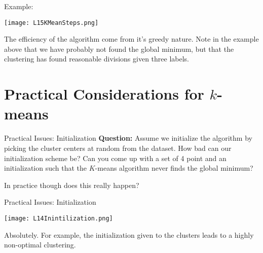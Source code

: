 \documentclass[10pt, table, dvipsnames,xcdraw,handout]{beamer}
\begin{document}
\begin{frame}[fragile]{Example: }
  \begin{minipage}[t][0.6\textheight][t]{\textwidth}
	\centering \texttt{[image: L15KMeanSteps.png]} 
  \end{minipage}
  \vfill
\begin{minipage}[t][0.4\textheight][t]{\textwidth}
The efficiency of the algorithm come from it's greedy nature. Note in the example above that we have probably not found the global minimum, but that the clustering has found reasonable divisions given three labels. 
\end{minipage}
\end{frame}



\section{Practical Considerations for $k$-means}




\begin{frame}[fragile]{Practical Issues: Initialization}
\textbf{Question:} Assume we initialize the algorithm by picking the cluster centers at random from the dataset. How bad can our initialization scheme be? Can you come up with a set of 4 point and an initialization such that the $K$-means algorithm never finds the global minimum?\pause

\vspace{12em}
In practice though does this really happen?
\end{frame}







\begin{frame}[fragile]{Practical Issues: Initialization}
  \begin{minipage}[t][0.5\textheight][t]{\textwidth}
	\centering \texttt{[image: L14Inintilization.png]} 
  \end{minipage}
  \vfill
\begin{minipage}[t][0.5\textheight][t]{\textwidth}
Absolutely. For example, the initialization given to the clusters leads to a highly non-optimal clustering. 
\end{minipage}
\end{frame}
\end{document}
